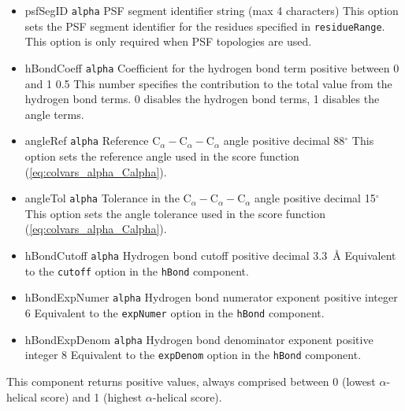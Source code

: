 {\begin{itemize}
\item %
  \key
    {psfSegID}{%
    \texttt{alpha}}{%
    PSF segment identifier}{%
    string (max 4 characters)}{%
    This option sets the PSF segment identifier for the residues
    specified in \texttt{residueRange}.  This option is only required
    when PSF topologies are used.}


\item %
  \keydef
    {hBondCoeff}{%
    \texttt{alpha}}{%
    Coefficient for the hydrogen bond term}{%
    positive between 0 and 1}{%
    0.5}{%
    This number specifies the contribution to the total value from the
    hydrogen bond terms.  0 disables the hydrogen bond terms, 1
    disables the angle terms.}

\item %
  \keydef
    {angleRef}{%
    \texttt{alpha}}{%
    Reference $\mathrm{C}_{\alpha} -
    \mathrm{C}_{\alpha} - \mathrm{C}_{\alpha}$ angle}{%
    positive decimal}{%
    88$^{\circ}$}{%
    This option sets the reference angle used in the score function
    (\ref{eq:colvars_alpha_Calpha}).}

\item %
  \keydef
    {angleTol}{%
    \texttt{alpha}}{%
    Tolerance in the $\mathrm{C}_{\alpha} -
    \mathrm{C}_{\alpha} - \mathrm{C}_{\alpha}$ angle}{%
    positive decimal}{%
    15$^{\circ}$}{%
    This option sets the angle tolerance used in the score function
    (\ref{eq:colvars_alpha_Calpha}).}

\item %
  \keydef
    {hBondCutoff}{%
    \texttt{alpha}}{%
    Hydrogen bond cutoff}{%
    positive decimal}{%
    3.3~\AA{}}{%
    Equivalent to the \texttt{cutoff} option in the \texttt{hBond}
    component.}

\item %
  \keydef
    {hBondExpNumer}{%
    \texttt{alpha}}{%
    Hydrogen bond numerator exponent}{%
    positive integer}{%
    6}{%
    Equivalent to the \texttt{expNumer} option in the \texttt{hBond}
    component.}

\item %
  \keydef
    {hBondExpDenom}{%
    \texttt{alpha}}{%
    Hydrogen bond denominator exponent}{%
    positive integer}{%
    8}{%
    Equivalent to the \texttt{expDenom} option in the \texttt{hBond}
    component.}

\end{itemize}

This component returns positive values, always comprised between 0
(lowest $\alpha$-helical score) and 1 (highest $\alpha$-helical
score).


}
